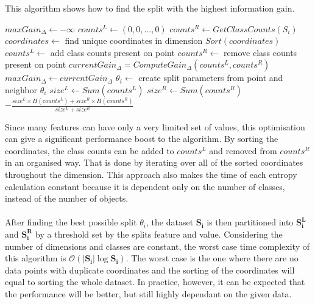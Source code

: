 \documentclass[11pt]{article}
\begin{document}
        \begin{algorithm}
          \caption{This algorithm shows how to find the split with the highest information gain.\cite{brabec}}
          \label{alg:best_split}
          \begin{algorithmic}[1] %
              \State $maxGain_\Delta \gets -\infty$
                \State $counts^L \gets (0, 0, ..., 0)$
                \State $counts^R \gets GetClassCounts(S_i)$
                \State $coordinates \gets$ find unique coordinates in dimension
                \State $Sort(coordinates)$
                  \State $counts^L \gets$ add class counts present on point
                  \State $counts^R \gets$ remove class counts present on point
                  \State $currentGain_\Delta = ComputeGain_\Delta(counts^L, counts^R)$
                    \State $maxGain_\Delta \gets currentGain_\Delta$
                    \State $\theta_i \gets$ create split parameters from point and neighbor
                  \EndIf
                \EndFor
              \EndFor
              \State \Return $\theta_i$
            \EndFunction
              \State $size^L \gets Sum(counts^L)$
              \State $size^R \gets Sum(counts^R)$
              \State \Return $- \frac{size^L \times H(counts^L) + size^R \times H(counts^R)}{size^L + size^R}$
            \EndFunction
          \end{algorithmic}
        \end{algorithm}
        Since many features can have only a very limited set of values, this optimisation can give a significant performance boost to the algorithm.\cite{brabec} By sorting the coordinates, the class counts can be added to $counts^L$ and removed from $counts^R$ in an organised way. That is done by iterating over all of the sorted coordinates throughout the dimension. This approach also makes the time of each entropy calculation constant because it is dependent only on the number of classes, instead of the number of objects.\cite{brabec}
        \\~\\
        After finding the best possible split $\theta_i$, the dataset $\mathbf{S_i}$ is then partitioned into $\mathbf{S_i^L}$ and $\mathbf{S_i^R}$ by a threshold set by the splits feature and value. Considering the number of dimensions and classes are constant, the worst case time complexity of this algorithm is $\mathcal{O}(|\mathbf{S_i}|\log{\mathbf{S_i}})$. The worst case is the one where there are no data points with duplicate coordinates and the sorting of the coordinates will equal to sorting the whole dataset. In practice, however, it can be expected that the performance will be better, but still highly dependant on the given data.\cite{brabec}
\end{document}

